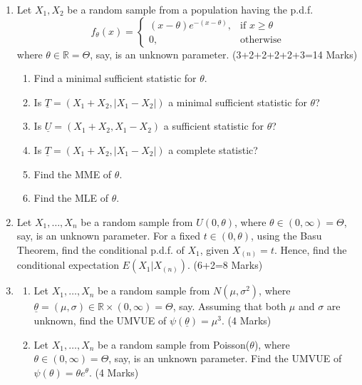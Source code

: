 \documentclass{article}
\begin{document}
\begin{enumerate}
    \item Let $X_{1}, X_{2}$ be a random sample from a population having the p.d.f.
    \[
    f_{\theta}(x) = 
    \begin{cases} 
    (x-\theta)e^{-(x-\theta)}, & \text{if } x \ge \theta \\
    0, & \text{otherwise}
    \end{cases}
    \]
    where $\theta \in \mathbb{R} = \Theta$, say, is an unknown parameter. \hfill (3+2+2+2+2+3=14 Marks)
    
    \begin{enumerate}
        \item Find a minimal sufficient statistic for $\theta$.
        \item Is $\underline{T} = (X_{1}+X_{2}, |X_{1}-X_{2}|)$ a minimal sufficient statistic for $\theta$?
        \item Is $\underline{U} = (X_{1}+X_{2}, X_{1}-X_{2})$ a sufficient statistic for $\theta$?
        \item Is $\underline{T} = (X_{1}+X_{2}, |X_{1}-X_{2}|)$ a complete statistic?
        \item Find the MME of $\theta$.
        \item Find the MLE of $\theta$.
    \end{enumerate}

    \item Let $X_{1}, \dots, X_{n}$ be a random sample from $U(0, \theta)$, where $\theta \in (0, \infty) = \Theta$, say, is an unknown parameter. For a fixed $t \in (0, \theta)$, using the Basu Theorem, find the conditional p.d.f. of $X_{1}$, given $X_{(n)} = t$. Hence, find the conditional expectation $E(X_{1}|X_{(n)})$. \hfill (6+2=8 Marks)

    \item 
    \begin{enumerate}
        \item Let $X_{1}, \dots, X_{n}$ be a random sample from $N(\mu, \sigma^{2})$, where $\underline{\theta} = (\mu, \sigma) \in \mathbb{R} \times (0, \infty) = \Theta$, say. Assuming that both $\mu$ and $\sigma$ are unknown, find the UMVUE of $\psi(\underline{\theta}) = \mu^{3}$. \hfill (4 Marks)
        \item Let $X_{1}, \dots, X_{n}$ be a random sample from Poisson($\theta$), where $\theta \in (0, \infty) = \Theta$, say, is an unknown parameter. Find the UMVUE of $\psi(\theta) = \theta e^{\theta}$. \hfill (4 Marks)
    \end{enumerate}


\end{enumerate}
\end{document}
